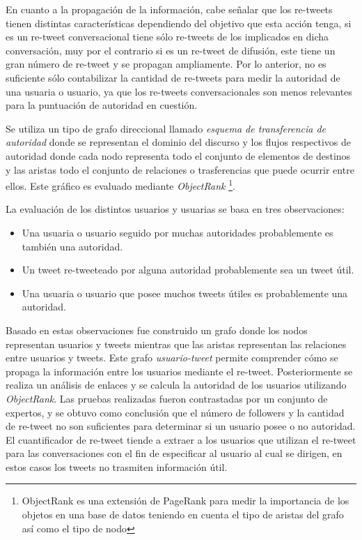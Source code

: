 En cuanto a la propagación de la información, cabe señalar que los re-tweets tienen distintas características dependiendo del objetivo que esta acción tenga, si es un re-tweet conversacional tiene sólo re-tweets de los implicados en dicha conversación, muy por el contrario si es un re-tweet de difusión, este tiene un  gran número de re-tweet y se propagan ampliamente. Por lo anterior, no es suficiente sólo contabilizar la cantidad de re-tweets para medir la autoridad de una usuaria o usuario, ya que los re-tweets conversacionales son menos relevantes para la puntuación de autoridad en cuestión. 


Se utiliza un tipo de grafo direccional llamado \emph{esquema de transferencia de autoridad} donde se representan el dominio del discurso y los flujos respectivos de autoridad donde cada nodo representa todo el conjunto de elementos de destinos y las aristas todo el conjunto de relaciones o trasferencias que puede ocurrir entre ellos. Este gráfico es evaluado mediante \emph{ObjectRank} \footnote{ObjectRank es una extensión de PageRank\cite{ilprints422} para medir la importancia de los objetos en una base de datos teniendo en cuenta el tipo de aristas del grafo así como el tipo de nodo}.

La evaluación de los distintos usuarios y usuarias se basa en tres observaciones:

\begin{itemize}
	\item Una usuaria o usuario seguido por muchas autoridades probablemente es también una autoridad.
	\item Un tweet re-tweeteado por alguna autoridad probablemente sea un tweet útil.
	\item Una usuaria o usuario que posee muchos tweets útiles es probablemente una autoridad.
\end{itemize} 

Basado en estas observaciones fue construido un grafo donde los nodos representan usuarios y tweets mientras que las aristas representan las relaciones entre usuarios y tweets. Este grafo \emph{usuario-tweet} permite comprender cómo se propaga la información entre los usuarios mediante el re-tweet. Posteriormente se realiza un análisis de enlaces y se calcula la autoridad de los usuarios utilizando \emph{ObjectRank}. Las pruebas realizadas fueron contrastadas por un conjunto de expertos, y se obtuvo como conclusión que el número de followers y la cantidad de re-tweet no son suficientes para determinar si un usuario posee o no autoridad. El cuantificador de re-tweet tiende a extraer a los usuarios que utilizan el re-tweet para las conversaciones con el fin de especificar al usuario al cual se dirigen, en estos casos los tweets no trasmiten información útil.

